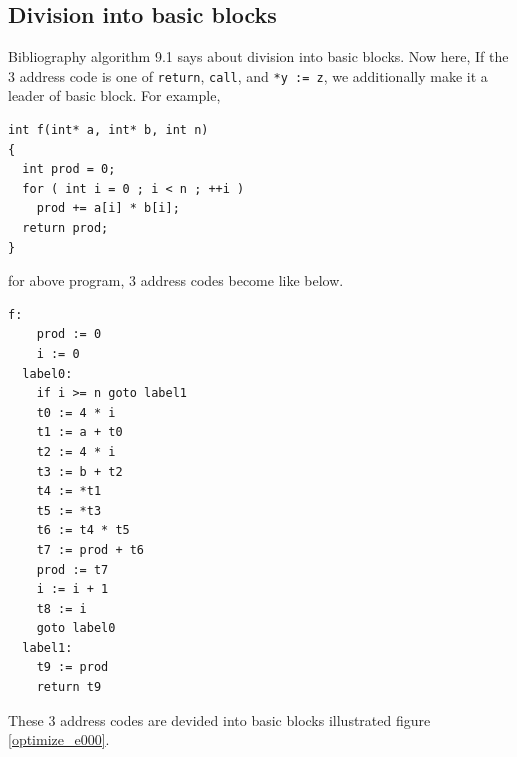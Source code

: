 \subsection{Division into basic blocks}

Bibliography \cite{doragon} algorithm 9.1 says about 
division into basic blocks. Now here, If the 3 address
code is one of {\tt{return}}, {\tt{call}},
and {\tt{*y := z}}, we additionally
make it  a leader of basic block.
For example,
\begin{verbatim}
int f(int* a, int* b, int n)
{
  int prod = 0;
  for ( int i = 0 ; i < n ; ++i )
    prod += a[i] * b[i];
  return prod;
}
\end{verbatim}
for above program, 3 address codes become like below.
\begin{verbatim}
f:
    prod := 0
    i := 0
  label0:
    if i >= n goto label1
    t0 := 4 * i
    t1 := a + t0
    t2 := 4 * i
    t3 := b + t2
    t4 := *t1
    t5 := *t3
    t6 := t4 * t5
    t7 := prod + t6
    prod := t7
    i := i + 1
    t8 := i
    goto label0
  label1:
    t9 := prod
    return t9
\end{verbatim}
These 3 address codes are devided into basic blocks illustrated
figure \ref{optimize_e000}.
